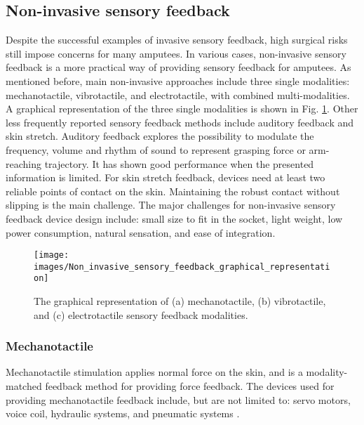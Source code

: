 \subsection{Non-invasive sensory feedback}
Despite the successful examples of invasive sensory feedback, high surgical risks still impose concerns for many amputees. In various cases, non-invasive sensory feedback is a more practical way of providing sensory feedback for amputees. As mentioned before, main non-invasive approaches include three single modalities: mechanotactile, vibrotactile, and electrotactile, with combined multi-modalities. A graphical representation of the three single modalities is shown in Fig. \ref{fig:graphical_representation_single_modalities}. 
Other less frequently reported sensory feedback methods include auditory feedback \cite{gonzalez2012psycho, wilson2016audio, lundborg1999hearing,gonzalez2010multichannel} and skin stretch.
Auditory feedback explores the possibility to modulate the frequency, volume and rhythm of sound to represent grasping force or arm-reaching trajectory. It has shown good performance when the presented information is limited.
For skin stretch feedback, devices need at least two reliable points of contact on the skin. Maintaining the robust contact without slipping is the main challenge. The major challenges for non-invasive sensory feedback device design include: small size to fit in the socket, light weight, low power consumption, natural sensation, and ease of integration. 
 
 \begin{figure}[htb]
    \centering
       \texttt{[image: images/Non\_invasive\_sensory\_feedback\_graphical\_representation]}
        \caption{The graphical representation of (a) mechanotactile, (b) vibrotactile, and (c) electrotactile sensory feedback modalities.}
        \label{fig:graphical_representation_single_modalities}
\end{figure}

\subsubsection{Mechanotactile}
Mechanotactile stimulation applies normal force on the skin, and is a modality-matched feedback method for providing force feedback.
The devices used for providing mechanotactile feedback include, but are not limited to: servo motors, voice coil, hydraulic systems, and pneumatic systems \cite{childress1980closed, antfolk2013sensory, schofield2014applications, svensson2017review}.


